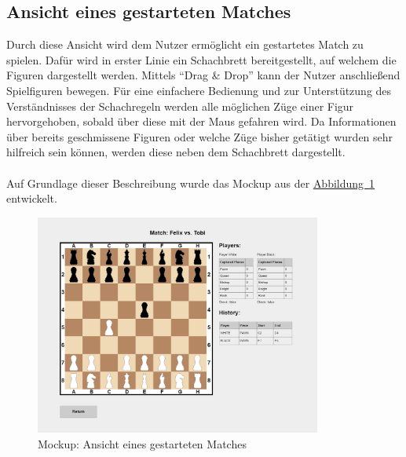\subsection{Ansicht eines gestarteten Matches}\label{sec:gameView}
Durch diese Ansicht wird dem Nutzer ermöglicht ein gestartetes Match zu spielen. Dafür wird in erster Linie ein Schachbrett bereitgestellt, auf welchem die Figuren dargestellt werden. Mittels \enquote{Drag \& Drop} kann der Nutzer anschließend Spielfiguren bewegen. Für eine einfachere Bedienung und zur Unterstützung des Verständnisses der Schachregeln werden alle möglichen Züge einer Figur hervorgehoben, sobald über diese mit der Maus gefahren wird. Da Informationen über bereits geschmissene Figuren oder welche Züge bisher getätigt wurden sehr hilfreich sein können, werden diese neben dem Schachbrett dargestellt.\\
\\
Auf Grundlage dieser Beschreibung wurde das Mockup aus der \hyperref[fig:gameView]{Abbildung~\ref{fig:gameView}} entwickelt.\\
\begin{figure}[htb]
	\includegraphics[width=0.84\textwidth]{images/game-view.png}
	\caption{Mockup: Ansicht eines gestarteten Matches}
	\label{fig:gameView}
\end{figure}


